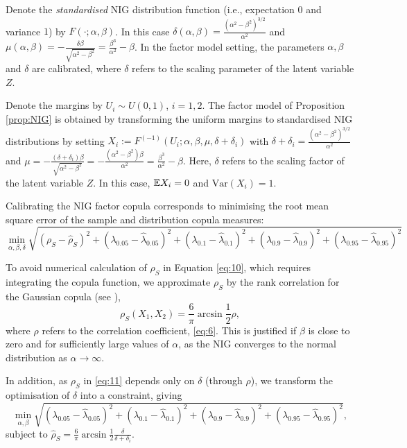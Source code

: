 Denote the {\em standardised\/} NIG distribution function (i.e.,
expectation $0$ and variance $1$) by $F(\cdot; \alpha, \beta)$. In this case
$\delta(\alpha,\beta)=\displaystyle\frac{(\alpha^2-\beta^2)^{3/2}}{\alpha^2}$
and $\mu(\alpha,\beta)=\displaystyle - \frac{\delta \beta}
{\sqrt{\alpha^2-\beta^2}} = \frac{\beta^3}{\alpha^2} -\beta$. In the
factor model setting, the parameters $\alpha, \beta$ and $\delta$ are
calibrated, where $\delta$ refers to the scaling parameter of the
latent variable $Z$. 



Denote the margins by
$U_i\sim U(0,1)$, $i=1,2$. The factor model of Proposition
\ref{prop:NIG} is 
obtained by transforming the uniform margins to standardised NIG
distributions by setting  
$X_i:=F^{(-1)}(U_i; \alpha, \beta, \mu, \delta+\delta_i)$ with 
$\delta+\delta_i=\displaystyle \frac{(\alpha^2-\beta^2)^{3/2}}
{\alpha^2}$ and $\mu=\displaystyle -\frac{(\delta+\delta_i)\beta}
{\sqrt{\alpha^2-\beta^2}} = -\frac{(\alpha^2-\beta^2) \beta}
{\alpha^2}=\frac{\beta^3}{\alpha^2}-\beta$. Here, $\delta$ refers to
the scaling factor of the latent variable $Z$. In 
this case, ${\mathbb{E}} X_i=0$ and $\text{Var}(X_i)=1$.

Calibrating the NIG factor copula corresponds to minimising the
root mean square error of the sample and distribution copula measures: 
\begin{equation*}
  \min_{\alpha, \beta, \delta} \sqrt{ (\rho_S - \hat\rho_S)^2 +
    (\lambda_{0.05}-\hat\lambda_{0.05})^2 + 
    (\lambda_{0.1}-\hat\lambda_{0.1})^2 + 
    (\lambda_{0.9}-\hat\lambda_{0.9})^2 + 
    (\lambda_{0.95}-\hat\lambda_{0.95})^2}
\end{equation*}

To avoid numerical calculation of $\rho_S$ in Equation
\eqref{eq:10}, which requires integrating the copula
function, we approximate $\rho_S$ by the rank correlation for the
Gaussian copula (see \citep[p.\ 215]{McNeil2005}), 
\begin{equation}
  \label{eq:11}
  \rho_S(X_1,X_2) = \frac{6}{\pi} \arcsin \frac{1}{2}\rho,
\end{equation}
where $\rho$ refers to the correlation coefficient, \eqref{eq:6}.
This is justified if $\beta$ is close to zero and for sufficiently
large values of $\alpha$, as the NIG converges to the normal
distribution as $\alpha\rightarrow\infty$. 

In addition, as $\rho_S$ in \eqref{eq:11} depends only on $\delta$ 
(through $\rho$), we transform the optimisation of $\delta$ into a
constraint, giving
\begin{equation*}
  \min_{\alpha, \beta} \sqrt{
    (\lambda_{0.05}-\hat\lambda_{0.05})^2 + 
    (\lambda_{0.1}-\hat\lambda_{0.1})^2 + 
    (\lambda_{0.9}-\hat\lambda_{0.9})^2 + 
    (\lambda_{0.95}-\hat\lambda_{0.95})^2},
\end{equation*}
subject to $\hat\rho_S=\displaystyle \frac{6}{\pi} \arcsin \frac{1}{2}
\frac{\delta}{\delta + \delta_i}$. 



